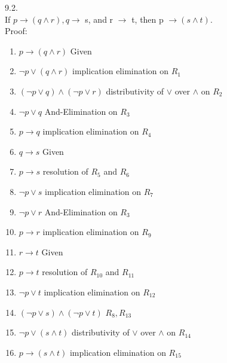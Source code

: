 \documentclass[a4paper]{article}
\begin{document}
9.2.\\
If $p \rightarrow (q \wedge r), q \rightarrow$ s, and r $\rightarrow$ t, then p $\rightarrow (s \wedge t).$\\
Proof:\\
\begin{enumerate}[1.]
    \item $p \rightarrow (q \wedge r)$ \hfill Given
    \item $\neg p \vee (q \wedge r)$ \hfill implication elimination on $R_1$
    \item $(\neg p \vee q) \wedge (\neg p \vee r)$ \hfill distributivity of $\vee$ over $\wedge$ on $R_2$
    \item $\neg p \vee q$ \hfill And-Elimination on $R_3$
    \item $p \rightarrow q$ \hfill implication elimination on $R_4$
    \item $q \rightarrow s$ \hfill Given
    \item $p \rightarrow s$ \hfill resolution of $R_5$ and $R_6$
    \item $\neg p \vee s$ \hfill implication elimination on $R_7$
    \item $\neg p \vee r$ \hfill And-Elimination on $R_3$
    \item $p \rightarrow r$ \hfill implication elimination on $R_9$
    \item $r \rightarrow t$ \hfill Given
    \item $p \rightarrow t$ \hfill resolution of $R_10$ and $R_{11}$
    \item $\neg p \vee t$ \hfill implication elimination on $R_{12}$
    \item $(\neg p \vee s) \wedge (\neg p \vee t)$ \hfill $R_8, R_{13}$
    \item $\neg p \vee (s \wedge t)$ \hfill distributivity of $\vee$ over $\wedge$ on $R_{14}$
    \item $p \rightarrow (s \wedge t)$ \hfill implication elimination on $R_{15}$
\end{enumerate}
\end{document}
